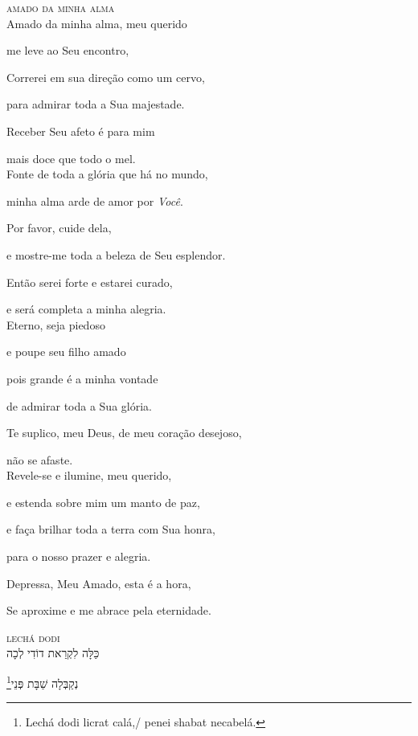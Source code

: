 \movetooddpage
\raggedright

\textsc{amado da minha alma}\\[15pt]

Amado da minha alma, meu querido

me leve ao Seu encontro,

Correrei em sua direção como um cervo,

para admirar toda a Sua majestade.

Receber Seu afeto é para mim

mais doce que todo o mel.\\[10pt]

Fonte de toda a glória que há no mundo,

minha alma arde de amor por \emph{Você}.

Por favor, cuide dela,

e mostre-me toda a beleza de Seu esplendor.

Então serei forte e estarei curado,

e será completa a minha alegria.\\[10pt]

Eterno, seja piedoso

e poupe seu filho amado

pois grande é a minha vontade

de admirar toda a Sua glória.

Te suplico, meu Deus, de meu coração desejoso,

não se afaste.\\[10pt]

Revele-se e ilumine, meu querido,

e estenda sobre mim um manto de paz,

e faça brilhar toda a terra com Sua honra,

para o nosso prazer e alegria.

Depressa, Meu Amado, esta é a hora,

Se aproxime e me abrace pela eternidade.

\movetoevenpage
\raggedleft
{}


\textsc{lechá dodi}\\[15pt]

כַּלָּה לִקְרַאת דוֹדִי לְכָה

\footnote{Lechá dodi licrat calá,/ penei shabat necabelá.}נְקַבְּלָה שַׁבָּת פְּנֵי\\[10pt]

